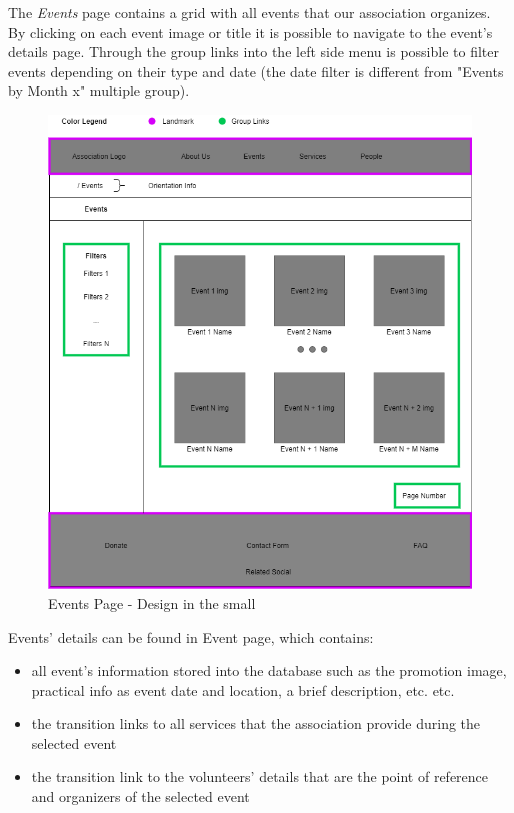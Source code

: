 The \emph{Events} page contains a grid with all events that our association organizes.  By clicking on each event image or title it is possible to navigate to the event's details page. Through the group links into the left side menu is possible to filter events depending on their type and date (the date filter is different from "Events by Month x" multiple group).

\begin{figure}[h!]
		\centering
		\begin{minipage}[b]{1\textwidth}
    			\includegraphics[width=\textwidth]{./assets/events.png}
			\caption{Events Page - Design in the small}
		\end{minipage}
	\end{figure}
\FloatBarrier 
\vspace{1cm}
\hspace{-1cm}
Events' details can be found in Event page, which contains:
\begin{itemize}
	\item all event's information stored into the database such as the promotion image, practical info as event date and location,  			a brief description, etc. etc.
	\item the transition links to all services that the association provide during the selected event
	\item the transition link to the volunteers' details that are the point of reference and organizers of the selected event
\end{itemize} 

